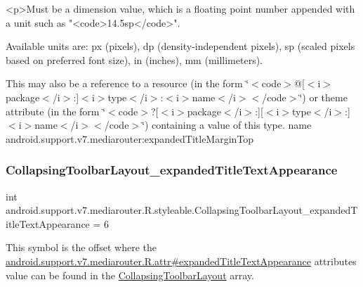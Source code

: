 \begin{DoxyVerb}      <p>Must be a dimension value, which is a floating point number appended with a unit such as "<code>14.5sp</code>".
\end{DoxyVerb}
 Available units are\+: px (pixels), dp (density-\/independent pixels), sp (scaled pixels based on preferred font size), in (inches), mm (millimeters). 

This may also be a reference to a resource (in the form \char`\"{}$<$code$>$@\mbox{[}$<$i$>$package$<$/i$>$\+:\mbox{]}$<$i$>$type$<$/i$>$\+:$<$i$>$name$<$/i$>$$<$/code$>$\char`\"{}) or theme attribute (in the form \char`\"{}$<$code$>$?\mbox{[}$<$i$>$package$<$/i$>$\+:\mbox{]}\mbox{[}$<$i$>$type$<$/i$>$\+:\mbox{]}$<$i$>$name$<$/i$>$$<$/code$>$\char`\"{}) containing a value of this type.  name android.\+support.\+v7.\+mediarouter\+:expanded\+Title\+Margin\+Top \mbox{\label{classandroid_1_1support_1_1v7_1_1mediarouter_1_1R_1_1styleable_a9562f47ec6ef350bc545bf9a99118b33}} 
\subsubsection{\texorpdfstring{Collapsing\+Toolbar\+Layout\+\_\+expanded\+Title\+Text\+Appearance}{CollapsingToolbarLayout\_expandedTitleTextAppearance}}
{\footnotesize\ttfamily int android.\+support.\+v7.\+mediarouter.\+R.\+styleable.\+Collapsing\+Toolbar\+Layout\+\_\+expanded\+Title\+Text\+Appearance = 6\hspace{0.3cm}{\ttfamily [static]}}

This symbol is the offset where the \hyperlink{classandroid_1_1support_1_1v7_1_1mediarouter_1_1R_1_1attr_a385a00e64804618af33beb484b83c09c}{android.\+support.\+v7.\+mediarouter.\+R.\+attr\#expanded\+Title\+Text\+Appearance} attribute\textquotesingle{}s value can be found in the \hyperlink{classandroid_1_1support_1_1v7_1_1mediarouter_1_1R_1_1styleable_aae2cb4975e9b9a19d129888f497cc386}{Collapsing\+Toolbar\+Layout} array.

